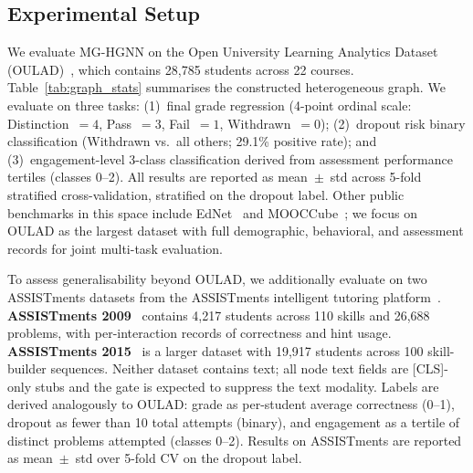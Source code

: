 \documentclass[sigconf]{acmart}
\begin{document}
\subsection{Experimental Setup}
We evaluate MG-HGNN on the Open University Learning
Analytics Dataset (OULAD)~\citep{kuzilek2017open},
which contains 28,785 students across 22 courses.
Table~\ref{tab:graph_stats} summarises the constructed
heterogeneous graph.
We evaluate on three tasks:
(1)~final grade regression (4-point ordinal scale:
Distinction~$= 4$, Pass~$= 3$, Fail~$= 1$,
Withdrawn~$= 0$);
(2)~dropout risk binary classification
(Withdrawn vs.\ all others; 29.1\% positive rate);
and (3)~engagement-level 3-class classification
derived from assessment performance tertiles
(classes 0--2).
All results are reported as mean~$\pm$~std across
5-fold stratified cross-validation, stratified on
the dropout label. Other public benchmarks in this
space include EdNet~\citep{choi2020ednet} and
MOOCCube~\citep{yu2020mooccube}; we focus on OULAD
as the largest dataset with full demographic,
behavioral, and assessment records for joint
multi-task evaluation.

To assess generalisability beyond OULAD, we additionally
evaluate on two ASSISTments datasets from the ASSISTments
intelligent tutoring platform~\citep{feng2009assistments,assistments2015}.
\textbf{ASSISTments 2009}~\citep{feng2009assistments}
contains 4,217 students across 110 skills and 26,688
problems, with per-interaction records of correctness and
hint usage. \textbf{ASSISTments 2015}~\citep{assistments2015}
is a larger dataset with 19,917 students across 100
skill-builder sequences.
Neither dataset contains text; all node text fields are
[CLS]-only stubs and the gate is expected to suppress the
text modality. Labels are derived analogously to OULAD:
grade as per-student average correctness (0--1),
dropout as fewer than 10 total attempts (binary),
and engagement as a tertile of distinct problems attempted
(classes 0--2). Results on ASSISTments are reported as
mean~$\pm$~std over 5-fold CV on the dropout label.
\end{document}
